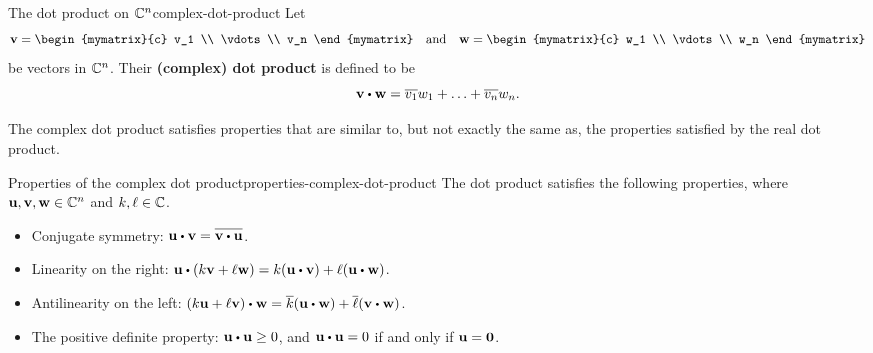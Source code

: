 \begin{definition}{The dot product on $\mathbb{C}^n$}{complex-dot-product}
  Let
  \begin{equation*}
    \vect{v}=\begin{mymatrix}{c} v_1 \\ \vdots \\ v_n \end{mymatrix}
    \quad\mbox{and}\quad
    \vect{w}=\begin{mymatrix}{c} w_1 \\ \vdots \\ w_n \end{mymatrix}
  \end{equation*}
  be vectors in $\mathbb{C}^n$. Their \textbf{(complex) dot product}%
  is defined to be
  \begin{equation*}
    \vect{v}\dotprod \vect{w} = \conjugate{v_1}w_1 + \ldots + \conjugate{v_n}w_n.
  \end{equation*}
\end{definition}

The complex dot product satisfies properties that are similar to, but
not exactly the same as, the properties satisfied by the real dot
product.

\begin{proposition}{Properties of the complex dot product}{properties-complex-dot-product}
  The dot product satisfies the following properties, where
  $\vect{u},\vect{v},\vect{w}\in\C^n$ and $k,\ell\in\mathbb{C}$.
  \begin{itemize}
  \item Conjugate symmetry: $\vect{u}\dotprod\vect{v}=\conjugate{\vect{v}\dotprod\vect{u}}$.
  \item Linearity on the right: $\vect{u}\dotprod(k\vect{v}+\ell\vect{w})
    =k(\vect{u}\dotprod \vect{v})+\ell(\vect{u}\dotprod\vect{w})$.
  \item Antilinearity on the left: $(k\vect{u}+\ell\vect{v})\dotprod\vect{w}=\conjugate{k}(\vect{u}\dotprod\vect{w})+\conjugate{\ell}(\vect{v}\dotprod\vect{w})$.
  \item The positive definite property: $\vect{u}\dotprod\vect{u}\geq 0$, and $\vect{u}\dotprod\vect{u}=0$ if and only if $\vect{u}=\vect{0}$.
  \end{itemize}
\end{proposition}

